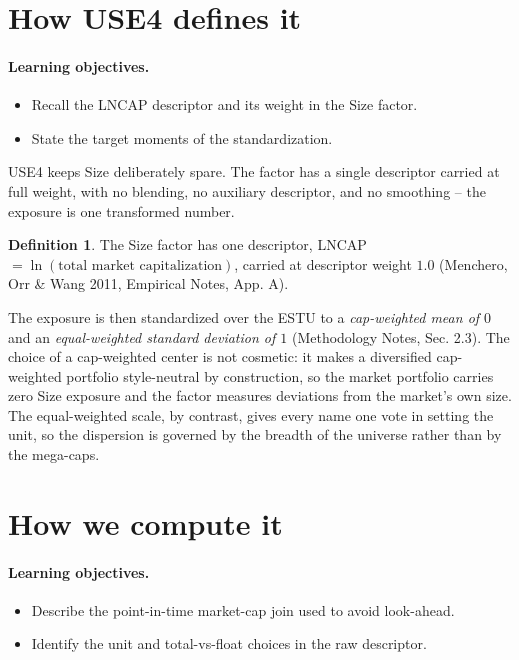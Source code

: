 \documentclass[11pt]{article}
\theoremstyle{definition}
\newtheorem{definition}{Definition}[section]
\theoremstyle{plain}
\theoremstyle{remark}
\begin{document}
\section{How USE4 defines it}\label{sec:def}

\paragraph{Learning objectives.}
\begin{itemize}[leftmargin=1.4em,topsep=2pt,itemsep=1pt]
  \item Recall the LNCAP descriptor and its weight in the Size factor.
  \item State the target moments of the standardization.
\end{itemize}

USE4 keeps Size deliberately spare. The factor has a single descriptor carried at full weight, with no blending, no auxiliary descriptor, and no smoothing -- the exposure is one transformed number.

\begin{definition}
The Size factor has one descriptor, LNCAP $=\ln(\text{total market capitalization})$, carried at descriptor weight $1.0$ (Menchero, Orr \& Wang 2011, Empirical Notes, App. A).
\end{definition}

The exposure is then standardized over the ESTU to a \emph{cap-weighted mean of $0$} and an \emph{equal-weighted standard deviation of $1$} (Methodology Notes, Sec. 2.3). The choice of a cap-weighted center is not cosmetic: it makes a diversified cap-weighted portfolio style-neutral by construction, so the market portfolio carries zero Size exposure and the factor measures deviations from the market's own size. The equal-weighted scale, by contrast, gives every name one vote in setting the unit, so the dispersion is governed by the breadth of the universe rather than by the mega-caps.

\section{How we compute it}\label{sec:compute}

\paragraph{Learning objectives.}
\begin{itemize}[leftmargin=1.4em,topsep=2pt,itemsep=1pt]
  \item Describe the point-in-time market-cap join used to avoid look-ahead.
  \item Identify the unit and total-vs-float choices in the raw descriptor.
\end{itemize}
\end{document}
